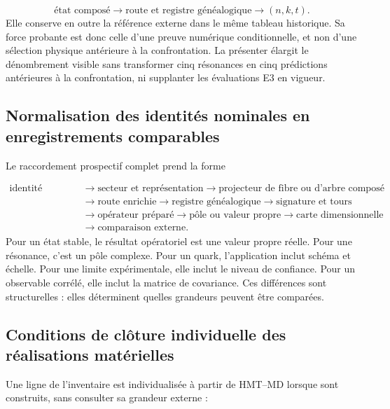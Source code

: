 \[
\text{état composé}
\longrightarrow\text{route et registre généalogique}
\longrightarrow(n,k,t).
\]
Elle conserve en outre la référence externe dans le même tableau historique. Sa force probante est donc celle d'une preuve numérique conditionnelle, et non d'une sélection physique antérieure à la confrontation. La présenter élargit le dénombrement visible sans transformer cinq résonances en cinq prédictions antérieures à la confrontation, ni supplanter les évaluations E3 en vigueur.
\fi

\subsection{Normalisation des identités nominales en enregistrements comparables}
Le raccordement prospectif complet prend la forme

\[
\begin{aligned}
\text{identité physique}
&\longrightarrow
\text{secteur et représentation}
\longrightarrow
\text{projecteur de fibre ou d'arbre composé}\\
&\longrightarrow
\text{route enrichie}
\longrightarrow
\text{registre généalogique}
\longrightarrow
\text{signature et tours}\\
&\longrightarrow
\text{opérateur préparé}
\longrightarrow
\text{pôle ou valeur propre}
\longrightarrow
\text{carte dimensionnelle}\\
&\longrightarrow
\text{comparaison externe}.
\end{aligned}
\]
Pour un état stable, le résultat opératoriel est une valeur propre réelle. Pour une résonance, c'est un pôle complexe. Pour un quark, l'application inclut schéma et échelle. Pour une limite expérimentale, elle inclut le niveau de confiance. Pour un observable corrélé, elle inclut la matrice de covariance. Ces différences sont structurelles : elles déterminent quelles grandeurs peuvent être comparées.

\subsection{Conditions de clôture individuelle des réalisations matérielles}
Une ligne de l'inventaire est individualisée à partir de HMT--MD lorsque sont construits, sans consulter sa grandeur externe :

